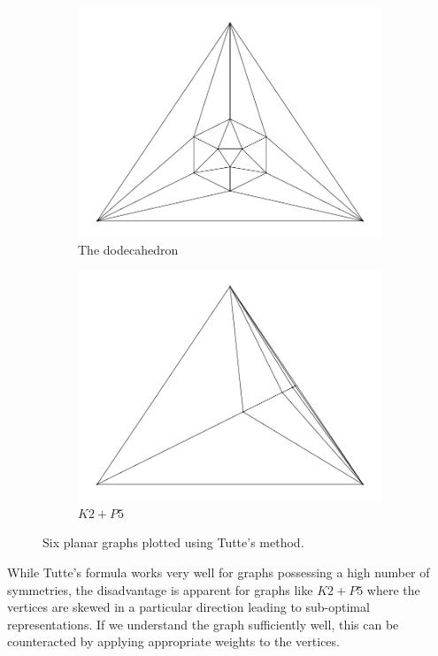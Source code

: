 \documentclass[12pt]{article}
\begin{document}
\begin{figure}[H]
\begin{subfigure}[b]{0.3\textwidth}
          \includegraphics[width = \textwidth]{../output/Q1-platonic-20.pdf}
          \caption{The dodecahedron}
      \end{subfigure}
      \hfill
      \begin{subfigure}[b]{0.3\textwidth}
          \centering 
          \includegraphics[width = \textwidth]{../output/Q1-k2-plus-p5.pdf}
          \caption{\(K2+P5\)}
      \end{subfigure}
      \hfill
      \caption{Six planar graphs plotted using Tutte's method.}
  \end{figure}
  While Tutte's formula works very well for graphs possessing a high number of
  symmetries, the disadvantage is apparent for graphs like \(K2+P5\) where the
  vertices are skewed in a particular direction leading to sub-optimal
  representations. If we understand the graph sufficiently well, this can be
  counteracted by applying appropriate weights to the vertices.
\end{document}
